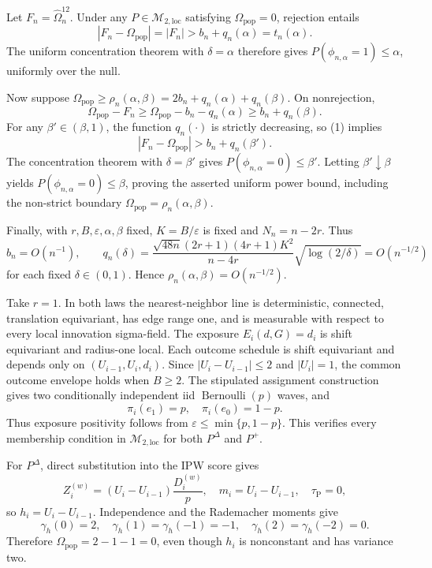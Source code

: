 Let \(F_n=\widehat\Omega_n^{12}\).  Under any \(P\in\mathcal M_{2,\mathrm{loc}}\) satisfying \(\Omega_{\mathrm{pop}}=0\), rejection entails
\[
 |F_n-\Omega_{\mathrm{pop}}|=|F_n|>b_n+q_n(\alpha)=t_n(\alpha).
\]
The uniform concentration theorem with \(\delta=\alpha\) therefore gives \(P(\phi_{n,\alpha}=1)\le\alpha\), uniformly over the null.

Now suppose \(\Omega_{\mathrm{pop}}\ge\rho_n(\alpha,\beta)=2b_n+q_n(\alpha)+q_n(\beta)\).  On nonrejection,
\[
 \Omega_{\mathrm{pop}}-F_n
 \ge \Omega_{\mathrm{pop}}-b_n-q_n(\alpha)
 \ge b_n+q_n(\beta). \tag{1}
\]
For any \(\beta'\in(\beta,1)\), the function \(q_n(\cdot)\) is strictly decreasing, so (1) implies
\[
 |F_n-\Omega_{\mathrm{pop}}|>b_n+q_n(\beta').
\]
The concentration theorem with \(\delta=\beta'\) gives \(P(\phi_{n,\alpha}=0)\le\beta'\).  Letting \(\beta'\downarrow\beta\) yields \(P(\phi_{n,\alpha}=0)\le\beta\), proving the asserted uniform power bound, including the non-strict boundary \(\Omega_{\mathrm{pop}}=\rho_n(\alpha,\beta)\).

Finally, with \(r,B,\varepsilon,\alpha,\beta\) fixed, \(K=B/\varepsilon\) is fixed and \(N_n=n-2r\).  Thus
\[
 b_n=O(n^{-1}),\qquad
 q_n(\delta)=
 \frac{\sqrt{48n}(2r+1)(4r+1)K^2}{n-4r}
 \sqrt{\log(2/\delta)}=O(n^{-1/2})
\]
for each fixed \(\delta\in(0,1)\).  Hence \(\rho_n(\alpha,\beta)=O(n^{-1/2})\).

Take \(r=1\).  In both laws the nearest-neighbor line is deterministic, connected, translation equivariant, has edge range one, and is measurable with respect to every local innovation sigma-field.  The exposure \(E_i(d,G)=d_i\) is shift equivariant and radius-one local.  Each outcome schedule is shift equivariant and depends only on \((U_{i-1},U_i,d_i)\).  Since \(|U_i-U_{i-1}|\le2\) and \(|U_i|=1\), the common outcome envelope holds when \(B\ge2\).  The stipulated assignment construction gives two conditionally independent iid \(\operatorname{Bernoulli}(p)\) waves, and
\[
 \pi_i(e_1)=p,\quad \pi_i(e_0)=1-p.
\]
Thus exposure positivity follows from \(\varepsilon\le\min\{p,1-p\}\).  This verifies every membership condition in \(\mathcal M_{2,\mathrm{loc}}\) for both \(P^{\Delta}\) and \(P^+\).

For \(P^{\Delta}\), direct substitution into the IPW score gives
\[
 Z_i^{(w)}=(U_i-U_{i-1})\frac{D_i^{(w)}}p,
 \quad
 m_i=U_i-U_{i-1},
 \quad
 \tau_{\mathrm P}=0,
\]
so \(h_i=U_i-U_{i-1}\).  Independence and the Rademacher moments give
\[
 \gamma_h(0)=2,\quad \gamma_h(1)=\gamma_h(-1)=-1,\quad
 \gamma_h(2)=\gamma_h(-2)=0.
\]
Therefore \(\Omega_{\mathrm{pop}}=2-1-1=0\), even though \(h_i\) is nonconstant and has variance two.

